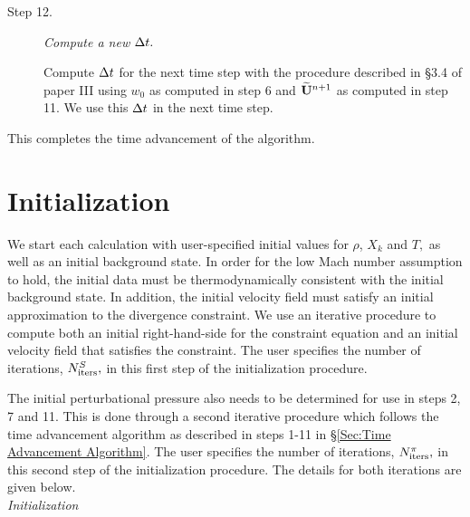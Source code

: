 \begin{description}
\item[Step 12.] {\em Compute a new $\Delta t.$}

Compute $\Delta t$ for the next time step with the procedure described in \S 3.4 of paper III
using $w_0$ as computed in step 6 and
$\widetilde{{\bf U}}^{n+1}$ as computed in step 11.  We use this $\Delta t$ in the next time step. 


\end{description}

\noindent This completes the time advancement of the algorithm.




\section{Initialization}\label{Sec:Initialization}

We start each calculation with user-specified initial values for
$\rho$, $X_k$ and $T,$ as well as an initial background state.  In
order for the low Mach number assumption to hold, the initial data
must be thermodynamically consistent with the initial background
state.  In addition, the initial velocity field must satisfy an
initial approximation to the divergence constraint.  We use an iterative
procedure to compute both an initial right-hand-side for the
constraint equation and an initial velocity field that satisfies
the constraint.  The user specifies the number of iterations,
$N_{\rm iters}^{S},$ in this first step of the initialization procedure.

The initial perturbational pressure also needs to be determined for
use in steps 2, 7 and 11. 
This is done through a second iterative procedure which follows the
time advancement algorithm as described in steps 1-11 in 
\S \ref{Sec:Time Advancement Algorithm}.  
The user specifies the number of iterations, 
$N_{\rm iters}^{\pi},$ in this second step of the initialization procedure.
The details for both iterations are given below.\\

 {\em Initialization}

